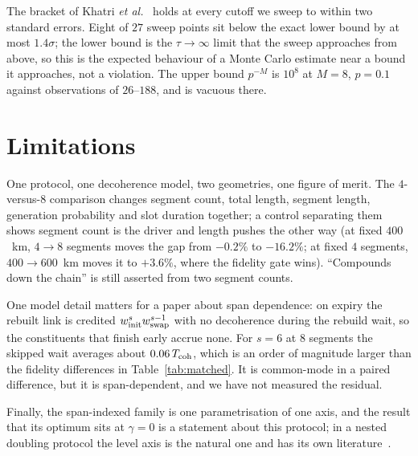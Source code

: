 \documentclass[aps,pra,twocolumn,superscriptaddress,floatfix,nofootinbib]{revtex4-2}
\begin{document}
The bracket of Khatri \emph{et al.}~\cite{Khatri2019} holds at every cutoff we
sweep to within two standard errors. Eight of $27$ sweep points sit below the
exact lower bound by at most $1.4\sigma$; the lower bound is the
$\tau\to\infty$ limit that the sweep approaches from above, so this is the
expected behaviour of a Monte Carlo estimate near a bound it approaches, not a
violation. The upper bound $p^{-M}$ is $10^{8}$ at $M=8$, $p=0.1$ against
observations of $26$--$188$, and is vacuous there.

\section{Limitations}

One protocol, one decoherence model, two geometries, one figure of merit. The
$4$-versus-$8$ comparison changes segment count, total length, segment length,
generation probability and slot duration together; a control separating them
shows segment count is the driver and length pushes the other way (at fixed
$400$~km, $4\to8$ segments moves the gap from $-0.2\%$ to $-16.2\%$; at fixed
$4$ segments, $400\to600$~km moves it to $+3.6\%$, where the fidelity gate
wins). ``Compounds down the chain'' is still asserted from two segment counts.

One model detail matters for a paper about span dependence: on expiry the
rebuilt link is credited $w_{\rm init}^{s}w_{\rm swap}^{s-1}$ with no
decoherence during the rebuild wait, so the constituents that finish early
accrue none. For $s=6$ at $8$ segments the skipped wait averages about
$0.06\,T_{\rm coh}$, which is an order of magnitude larger than the fidelity
differences in Table~\ref{tab:matched}. It is common-mode in a paired
difference, but it is span-dependent, and we have not measured the residual.

Finally, the span-indexed family is one parametrisation of one axis, and the
result that its optimum sits at $\gamma=0$ is a statement about this protocol;
in a nested doubling protocol the level axis is the natural one and has its own
literature~\cite{Santra2019,Li2021}.
\end{document}
